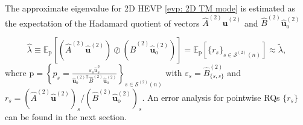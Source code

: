 \documentclass[11pt]{article}
\newcommand{\tr}{\textcolor{red}}
\def\u{\mathbf{u}}
\def\w{\mathbf{w}}
\numberwithin{equation}{section}
\begin{document}

The approximate eigenvalue for 2D HEVP \eqref{evp: 2D TM mode} is estimated as the expectation of the Hadamard quotient of vectors $\widehat{A}^{(2)} \widehat{\mathbf{u}}^{(2)}$ and $\widehat{B}^{(2)} \widehat{\mathbf{u}}^{(2)}_{\mathrm{o}}$

\begin{equation} \label{def: dot rate of 2D}
\widehat{\lambda}
\equiv
\mathbb{E}_{\mathrm{p}} \left[
\left(\widehat{A}^{(2)}\widehat{\mathbf{u}}^{(2)}\right)\oslash\left(\widehat{B}^{(2)}\widehat{\mathbf{u}}^{(2)}_{\mathrm{o}}\right)
\right]
=
\mathbb{E}_{\mathrm{p}}
\left[
\{r_{s}\}_{s\in\mathcal{S}^{(2)}(n)}
\right]
\approx \widetilde{\lambda},
\end{equation}
where $\mathrm{p} = \left\{ p_{s} = \frac{\varepsilon_{s} \widehat{u}_{s}^2}{\widehat{\mathbf{u}}_{\mathrm{o}}^{(2)\mathsf{T}} \widehat{B}^{(2)} \widehat{\mathbf{u}}^{(2)}_{\mathrm{o}}} \right\}_{s\in\mathcal{S}^{(2)}(n)}$ with $\varepsilon_{s} = \widehat{B}^{(2)}_{\{s,s\}}$ and $ r_{s} = \left(\widehat{A}^{(2)} \widehat{\u}^{(2)}\right)_{s} \Bigg/\left(\widehat{B}^{(2)} \widehat{\mathbf{u}}^{(2)}_{\mathrm{o}}\right)_{s} $.  An error analysis for pointwise RQs $\{r_{s}\} $ can be found in the next section.
\end{document}
